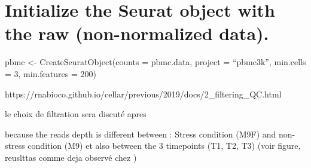 \documentclass[
  11pt,
  a4paper,
]{report}
\begin{document}
\chapter{Initialize the Seurat object with the raw (non-normalized
data).}\label{initialize-the-seurat-object-with-the-raw-non-normalized-data.}

pbmc \textless- CreateSeuratObject(counts = pbmc.data, project =
``pbmc3k'', min.cells = 3, min.features = 200)

https://rnabioco.github.io/cellar/previous/2019/docs/2\_filtering\_QC.html

le choix de filtration sera discuté apres

because the reads depth is different between : Stress condition (M9F)
and non-stress condition (M9) et also between the 3 timepoints (T1, T2,
T3) (voir figure, reuslttas comme deja observé chez )
\end{document}
